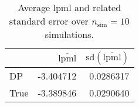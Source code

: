 \begin{table}[H]

\caption{Average lpml and related standard error over $n_{\text{sim}} = 10$ simulations.}
\centering
\begin{tabular}[t]{lrr}
\toprule
  & $\overbar{\text{lpml}}$ & $\text{sd}(\overbar{\text{lpml}})$\\
\midrule
DP & -3.404712 & 0.0286317\\
True & -3.389846 & 0.0290640\\
\bottomrule
\end{tabular}
\end{table}